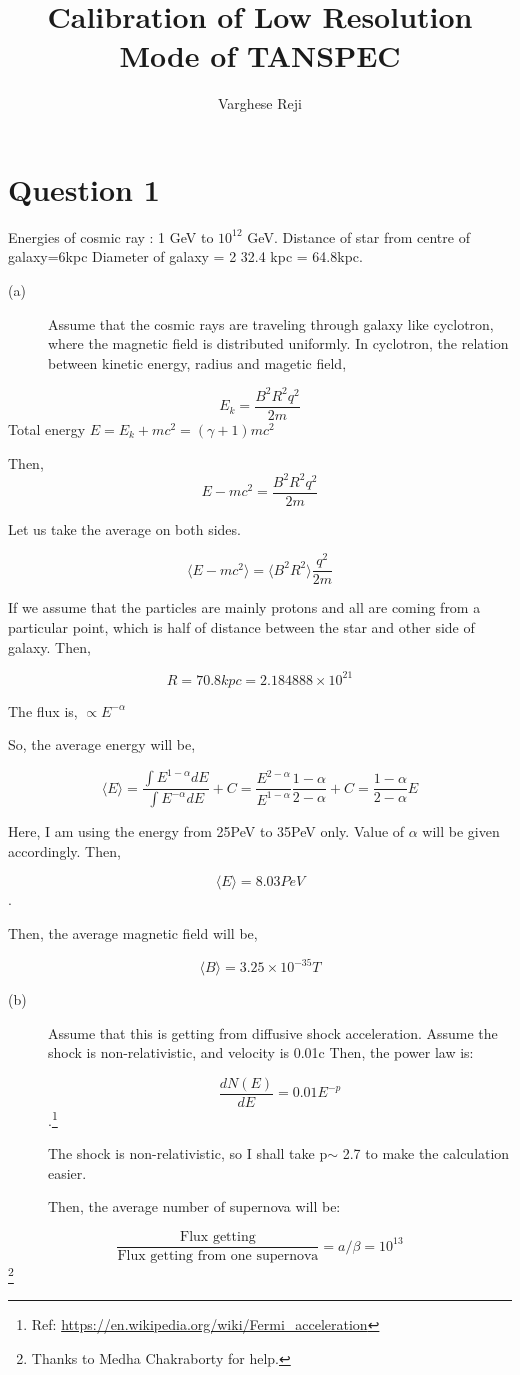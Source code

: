\documentclass[a4paper,12pt]{article}
\author{Varghese Reji}
\date{}
\title{Calibration of Low Resolution Mode of TANSPEC}
\begin{document}
\maketitle

\section*{Question 1}
\label{sec:org0a576f9}

Energies of cosmic ray : 1 GeV to \(10^{12}\) GeV.
Distance of star from centre of galaxy=6kpc
Diameter of galaxy =  2 \texttimes{} 32.4 kpc = 64.8kpc.
\begin{description}
\item[{(a)}] Assume that the cosmic rays are traveling through galaxy like cyclotron, where the magnetic field is distributed uniformly. In cyclotron, the relation between kinetic energy, radius and magetic field,
\end{description}

$$E_k = \frac{B^2 R^2 q^2}{2 m}$$
Total energy \(E = E_k+mc^2 = (\gamma +1)mc^2\)

Then, $$E - mc^2 = \frac{B^2 R^2 q^2}{2 m}$$

Let us take the average on both sides.

$$\langle E - mc^2 \rangle = \langle B^2R^2 \rangle \frac{q^2}{2m}$$

If we assume that the particles are mainly protons and all are coming from a particular point, which is half of distance between the star and other side of galaxy. Then,

$$R = 70.8 kpc = 2.184888\times 10^{21}$$

The flux is, \(\propto E^{-\alpha}\)

So, the average energy will be,

$$\langle E \rangle = \frac{\int E^{1-\alpha} dE}{\int E^{-\alpha} dE}+C=\frac{E^{2-\alpha}}{E^{1-\alpha}}\frac{1-\alpha}{2-\alpha}+C=\frac{1-\alpha}{2-\alpha}E$$

Here, I am using the energy from 25PeV to 35PeV only. Value of \(\alpha\) will be given accordingly. Then,

$$ \langle E \rangle = 8.03 PeV$$.

Then, the average magnetic field will be,

$$ \langle B \rangle = 3.25\times10^{-35} T$$

\begin{description}
\item[{(b)}] Assume that this is getting from diffusive shock acceleration. Assume the shock is non-relativistic, and velocity is 0.01c Then, the power law is:

$$\frac{dN(E)}{dE} = 0.01 E^{-p}$$.\footnote{Ref: \url{https://en.wikipedia.org/wiki/Fermi\_acceleration}}

The shock is non-relativistic, so I shall take p\(\sim\) 2.7 to make the calculation easier.

Then, the average number of supernova will be:
\end{description}
$$  \frac{\text{Flux getting}}{\text{Flux getting from one supernova}} = a/ \beta = 10^{13} $$\footnote{Thanks to Medha Chakraborty for help.}
\end{document}
